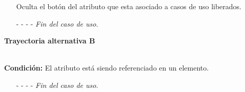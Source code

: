 \begin{enumerate}
	\UCpaso[\UCsist] Oculta el botón \eliminar del atributo que esta asociado a casos de uso liberados.
	\item[- -] - - {\em {Fin del caso de uso}}.
\end{enumerate}
	\hypertarget{CU7-1-3:TAB}{\textbf{Trayectoria alternativa B}}\\
	\noindent \textbf{Condición:} El atributo está siendo referenciado en un elemento.
	\begin{enumerate}
		\UCpaso[\UCsist] Muestra la pantalla  o  con el mensaje .
		\item[- -] - - {\em {Fin del caso de uso}}.%
	\end{enumerate}
